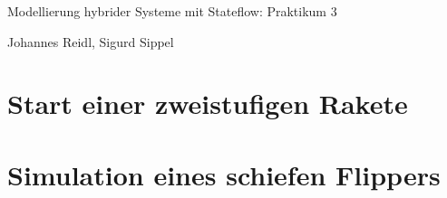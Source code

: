 \documentclass[10pt,a4paper]{article}
\begin{document}
\begin{center}
Modellierung hybrider Systeme mit Stateflow: Praktikum 3

Johannes Reidl, Sigurd Sippel

\end{center}

\section{Start einer zweistufigen Rakete}

\section{Simulation eines schiefen Flippers}
\end{document}
